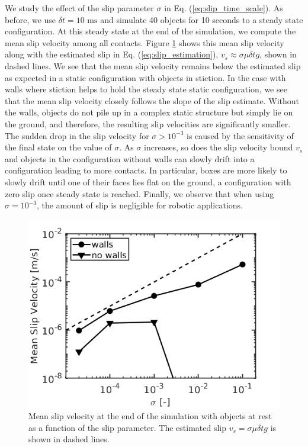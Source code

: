 We study the effect of the slip parameter $\sigma$ in Eq.
(\ref{eq:slip_time_scale}). As before, we use $\delta t = 10\text{ ms}$ and
simulate 40 objects for 10 seconds to a steady state configuration. At this
steady state at the end of the simulation, we compute the mean slip velocity
among all contacts. Figure \ref{fig:clutter_sigma_vt} shows this mean slip
velocity along with the estimated slip in Eq. (\ref{eq:slip_estimation}), $v_s
\approx\sigma\mu\delta t g$, shown in dashed lines. We see that the mean slip
velocity remains below the estimated slip as expected in a static configuration
with objects in stiction. In the case with walls where stiction helps to hold
the steady state static configuration, we see that the mean slip velocity
closely follows the slope of the slip estimate. Without the walls, objects do
not pile up in a complex static structure but simply lie on the ground, and
therefore, the resulting slip velocities are significantly smaller. The sudden
drop in the slip velocity for $\sigma>10^{-3}$ is caused by the sensitivity of
the final state on the value of $\sigma$. As $\sigma$ increases, so does the
slip velocity bound $v_s$ and objects in the configuration without walls can
slowly drift into a configuration leading to more contacts. In particular, boxes
are more likely to slowly drift until one of their faces lies flat
on the ground, a configuration with zero slip once steady state is reached.
Finally, we observe that when using $\sigma=10^{-3}$, the amount of slip is
negligible for robotic applications.
\begin{figure}[!h]
	\centering
	\includegraphics[width=0.7\columnwidth]{figures/clutter/sigma_vt.png}
	\caption{\label{fig:clutter_sigma_vt} 
	Mean slip velocity at the end of the simulation with objects at rest as a
	function of the slip parameter. The estimated slip $v_s = \sigma\mu\delta t g$ is shown in dashed lines.}
\end{figure}

